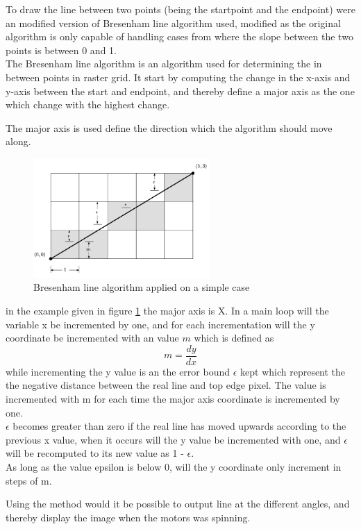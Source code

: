To draw the line between two points (being the startpoint and the endpoint) were an modified version of Bresenham line algorithm used,  modified as the original algorithm is only capable of handling cases from where the slope between the two points is between 0 and 1. \\

The Bresenham line algorithm is an algorithm used for determining the in between points in raster grid.  It start by computing the change in the x-axis and y-axis  between the start and endpoint, and thereby define a major axis as the one which change with the highest change. 


The major axis is used define the direction which the algorithm should move along. 

\begin{figure}[H]
\center
\includegraphics[width = 0.6\textwidth]{images/bresenham}
\caption{Bresenham line algorithm applied on a simple case}
\label{fig:bresenham_line}
\end{figure}

in the example given in figure \ref{fig:bresenham_line} the major axis is X. In a main loop will the variable x be incremented by one, and for each incrementation will the y coordinate be incremented with an value $m$ which is defined as $$m = \frac{dy}{dx}$$ while incrementing the y value is an the error bound $\epsilon$  kept which represent the the negative distance between the real line and top edge pixel.  The value is incremented with m for each time the major axis coordinate is incremented by one. \\
$\epsilon$ becomes greater than zero  if the real line has moved upwards according to the previous x value, when it occurs will the y value  be incremented with one, and $\epsilon$ will be recomputed to its new value as 1 - $\epsilon$. \\

As long as the  value  epsilon  is below 0, will the y coordinate only increment in steps of m. 

Using the method would it be possible to output line at the different angles, and thereby display the image when the motors was spinning. 



